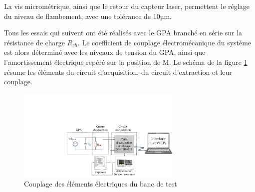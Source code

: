La vis micrométrique, ainsi que le retour du capteur laser, permettent le réglage du niveau de flambement, avec une tolérance de 10µm.

Tous les essais qui suivent ont été réalisés avec le GPA branché en série sur la résistance de charge $R_{ch}$. Le coefficient de couplage électromécanique du système est alors déterminé avec les niveaux de tension du GPA, ainsi que l'amortissement électrique repéré sur la position de M. Le schéma de la figure \ref{fig:BDT_acquisition} résume les éléments du circuit d'acquisition, du circuit d'extraction et leur couplage.
\begin{figure}[!htbp]
\begin{center}
    \captionsetup{justification=centering}
	\includegraphics[trim={9.5cm 0cm 0cm 7cm},clip, width=0.7\textwidth]{../Chap3/Figure/BDT_acquisition.pdf}
	\caption{Couplage des éléments électriques du banc de test}
	\label{fig:BDT_acquisition}
\end{center}
\end{figure}
